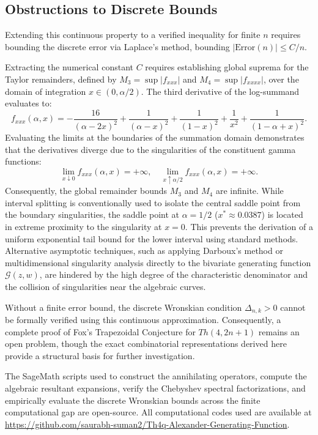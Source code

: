 \documentclass[11pt]{article}
\begin{document}
\subsection{Obstructions to Discrete Bounds}

Extending this continuous property to a verified inequality for finite $n$ requires bounding the discrete error via Laplace's method, bounding $|\text{Error}(n)| \le C/n$.

Extracting the numerical constant $C$ requires establishing global suprema for the Taylor remainders, defined by $M_3 = \sup |f_{xxx}|$ and $M_4 = \sup |f_{xxxx}|$, over the domain of integration $x \in (0, \alpha/2)$. The third derivative of the log-summand evaluates to:
\begin{equation*}
f_{xxx}(\alpha, x) = -\frac{16}{(\alpha - 2x)^2} + \frac{1}{(\alpha - x)^2} + \frac{1}{(1 - x)^2} + \frac{1}{x^2} + \frac{1}{(1 - \alpha + x)^2}.
\end{equation*}
Evaluating the limits at the boundaries of the summation domain demonstrates that the derivatives diverge due to the singularities of the constituent gamma functions:
\begin{equation*}
\lim_{x \downarrow 0} f_{xxx}(\alpha, x) = +\infty, \quad \lim_{x \uparrow \alpha/2} f_{xxx}(\alpha, x) = +\infty.
\end{equation*}
Consequently, the global remainder bounds $M_3$ and $M_4$ are infinite. While interval splitting is conventionally used to isolate the central saddle point from the boundary singularities, the saddle point at $\alpha=1/2$ ($x^* \approx 0.0387$) is located in extreme proximity to the singularity at $x=0$. This prevents the derivation of a uniform exponential tail bound for the lower interval using standard methods. Alternative asymptotic techniques, such as applying Darboux's method or multidimensional singularity analysis directly to the bivariate generating function $\mathcal{G}(z,w)$, are hindered by the high degree of the characteristic denominator and the collision of singularities near the algebraic curves. 

Without a finite error bound, the discrete Wronskian condition $\Delta_{n,k} > 0$ cannot be formally verified using this continuous approximation. Consequently, a complete proof of Fox's Trapezoidal Conjecture for $Th(4, 2n+1)$ remains an open problem, though the exact combinatorial representations derived here provide a structural basis for further investigation.

The SageMath scripts used to construct the annihilating operators, compute the algebraic resultant expansions, verify the Chebyshev spectral factorizations, and empirically evaluate the discrete Wronskian bounds across the finite computational gap are open-source. All computational codes used are available at \url{https://github.com/saurabh-suman2/Th4q-Alexander-Generating-Function}.
\end{document}
